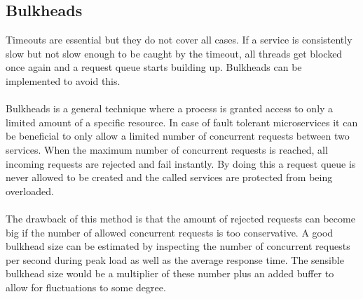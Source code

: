 \subsection{Bulkheads}
Timeouts are essential but they do not cover all cases. If a service
is consistently slow but not slow enough to be caught by the timeout,
all threads get blocked once again and a request queue starts building
up. Bulkheads can be implemented to avoid this.
\\\\
Bulkheads is a general technique where a process is granted access to
only a limited amount of a specific resource. In case of
fault tolerant microservices it can be beneficial to only allow a
limited number of concurrent requests between two services. When the
maximum number of concurrent requests is reached, all incoming
requests are rejected and fail instantly. By doing this a request
queue is never allowed to be created and the called services are
protected from being overloaded.
\\\\
The drawback of this method is that the amount of rejected requests
can become big if the number of allowed concurrent requests is too
conservative. A good bulkhead size can be estimated by inspecting the
number of concurrent requests per second during peak load as well as
the average response time. The sensible bulkhead size would be a
multiplier of these number plus an added buffer to allow for
fluctuations to some degree.

